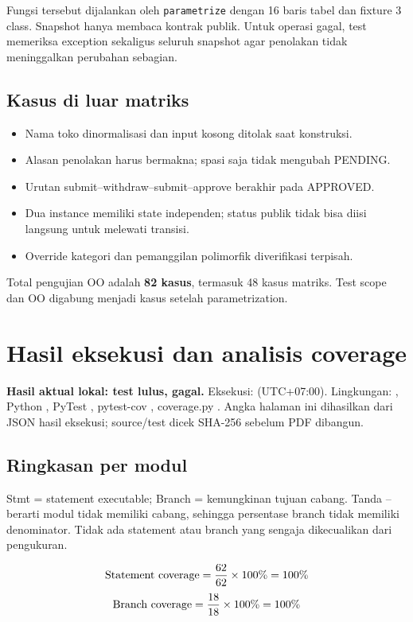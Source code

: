 \documentclass[11pt,a4paper]{article}
\newcommand{\note}[1]{\begingroup\setlength{\fboxsep}{9pt}
\colorbox{pale}{\parbox{\dimexpr\linewidth-18pt\relax}{\small #1}}\par\endgroup}
\begin{document}
Fungsi tersebut dijalankan oleh \texttt{parametrize} dengan 16 baris tabel
dan fixture 3 class. Snapshot hanya membaca kontrak publik. Untuk operasi
gagal, test memeriksa exception sekaligus seluruh snapshot agar penolakan
tidak meninggalkan perubahan sebagian.

\subsection{Kasus di luar matriks}
\begin{itemize}
\item Nama toko dinormalisasi dan input kosong ditolak saat konstruksi.
\item Alasan penolakan harus bermakna; spasi saja tidak mengubah PENDING.
\item Urutan submit--withdraw--submit--approve berakhir pada APPROVED.
\item Dua instance memiliki state independen; status publik tidak bisa diisi
langsung untuk melewati transisi.
\item Override kategori dan pemanggilan polimorfik diverifikasi terpisah.
\end{itemize}
Total pengujian OO adalah \textbf{82 kasus}, termasuk 48 kasus matriks.
Test scope dan OO digabung menjadi \TestTotal{} kasus setelah parametrization.

\newpage
\section{Hasil eksekusi dan analisis coverage}
\note{\textbf{Hasil aktual lokal: \TestTotal{} test lulus, \TestFailures{}
gagal.} Eksekusi: \texttt{\RunAt} (UTC+07:00). Lingkungan:
\RunPlatform{}, Python \PythonVersion{}, PyTest \PytestVersion{},
pytest-cov \PytestCovVersion{}, coverage.py \CovVersion{}. Angka halaman
ini dihasilkan dari JSON hasil eksekusi; source/test dicek SHA-256 sebelum
PDF dibangun.}

\subsection{Ringkasan per modul}
\small

\normalsize

Stmt = statement executable; Branch = kemungkinan tujuan cabang.
Tanda -- berarti modul tidak memiliki cabang, sehingga persentase branch
tidak memiliki denominator. Tidak ada statement atau branch yang sengaja
dikecualikan dari pengukuran.

\[
\text{Statement coverage} = \frac{62}{62}\times100\%=100\%
\]
\[
\text{Branch coverage} = \frac{18}{18}\times100\%=100\%
\]

\end{document}

